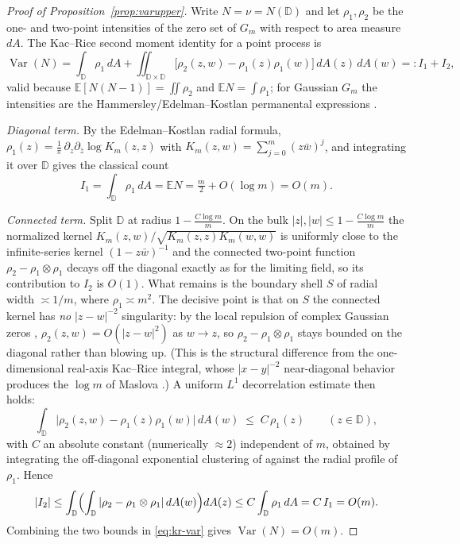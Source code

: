 \documentclass[11pt]{article}
\newcommand{\D}{\mathbb{D}}
\newcommand{\E}{\mathbb{E}}
\begin{document}
\begin{proof}[Proof of Proposition~\ref{prop:varupper}]
Write $N=\nu=N(\D)$ and let $\rho_1,\rho_2$ be the one- and two-point intensities
of the zero set of $G_m$ with respect to area measure $dA$.  The Kac--Rice second
moment identity for a point process is
\begin{equation}\label{eq:kr-var}
\operatorname{Var}(N)
=\int_{\D}\rho_1\,dA
+\iint_{\D\times\D}\bigl[\rho_2(z,w)-\rho_1(z)\rho_1(w)\bigr]\,dA(z)\,dA(w)
=:I_1+I_2,
\end{equation}
valid because $\E[N(N-1)]=\iint\rho_2$ and $\E N=\int\rho_1$; for Gaussian
$G_m$ the intensities are the Hammersley/Edelman--Kostlan permanental expressions
\cite{HKPV}.

\emph{Diagonal term.}  By the Edelman--Kostlan radial formula,
$\rho_1(z)=\frac1\pi\,\partial_z\partial_{\bar z}\log K_m(z,z)$ with
$K_m(z,w)=\sum_{j=0}^m(z\bar w)^j$, and integrating it over $\D$ gives the
classical count
\[
I_1=\int_\D\rho_1\,dA=\E N=\tfrac m2+O(\log m)=O(m).
\]

\emph{Connected term.}  Split $\D$ at radius $1-\frac{C\log m}{m}$.  On the bulk
$|z|,|w|\le1-\frac{C\log m}{m}$ the normalized kernel
$K_m(z,w)/\sqrt{K_m(z,z)K_m(w,w)}$ is uniformly close to the infinite-series
kernel $(1-z\bar w)^{-1}$ and the connected two-point function
$\rho_2-\rho_1\otimes\rho_1$ decays off the diagonal exactly as for the limiting
field, so its contribution to $I_2$ is $O(1)$.  What remains is the boundary
shell $S$ of radial width $\asymp1/m$, where $\rho_1\asymp m^2$.  The decisive
point is that on $S$ the connected kernel has \emph{no} $|z-w|^{-2}$ singularity:
by the local repulsion of complex Gaussian zeros \cite{NS},
$\rho_2(z,w)=O(|z-w|^2)$ as $w\to z$, so $\rho_2-\rho_1\otimes\rho_1$ stays
bounded on the diagonal rather than blowing up.  (This is the structural
difference from the one-dimensional real-axis Kac--Rice integral, whose
$|x-y|^{-2}$ near-diagonal behavior produces the $\log m$ of Maslova
\cite{Maslova}.)  A uniform $L^1$ decorrelation estimate then holds:
\[
\int_{\D}\bigl|\rho_2(z,w)-\rho_1(z)\rho_1(w)\bigr|\,dA(w)\;\le\;C\,\rho_1(z)
\qquad(z\in\D),
\]
with $C$ an absolute constant (numerically $\approx2$) independent of $m$,
obtained by integrating the off-diagonal exponential clustering of \cite{NS}
against the radial profile of $\rho_1$.  Hence
\[
|I_2|\le\int_\D\Bigl(\int_\D|\rho_2-\rho_1\otimes\rho_1|\,dA(w)\Bigr)dA(z)
\le C\int_\D\rho_1\,dA=C\,I_1=O(m).
\]
Combining the two bounds in \eqref{eq:kr-var} gives
$\operatorname{Var}(N)=O(m)$.
\end{proof}
\end{document}

